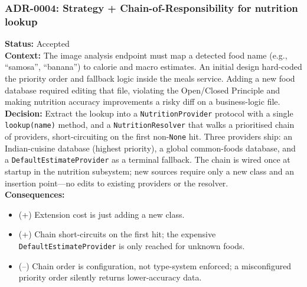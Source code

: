 \documentclass[11pt]{article}
\begin{document}
\subsubsection{ADR-0004: Strategy + Chain-of-Responsibility for nutrition lookup}
\textbf{Status:} Accepted \\
\textbf{Context:} The image analysis endpoint must map a detected food name (e.g., ``samosa'',
``banana'') to calorie and macro estimates. An initial design hard-coded the priority order and
fallback logic inside the meals service. Adding a new food database required editing that file,
violating the Open/Closed Principle and making nutrition accuracy improvements a risky diff
on a business-logic file. \\
\textbf{Decision:} Extract the lookup into a \texttt{NutritionProvider} protocol with a single
\texttt{lookup(name)} method, and a \texttt{NutritionResolver} that walks a prioritised chain
of providers, short-circuiting on the first non-\texttt{None} hit. Three providers ship:
an Indian-cuisine database (highest priority), a global common-foods database, and a
\texttt{DefaultEstimateProvider} as a terminal fallback. The chain is wired once at startup
in the nutrition subsystem; new sources require only a new class and an insertion point---no
edits to existing providers or the resolver. \\
\textbf{Consequences:}
\begin{itemize}[leftmargin=1.2em]
  \item (+) Extension cost is just adding a new class.
  \item (+) Chain short-circuits on the first hit; the expensive \texttt{DefaultEstimateProvider} is only reached for unknown foods.
  \item (--) Chain order is configuration, not type-system enforced; a misconfigured priority order silently returns lower-accuracy data.
\end{itemize}

\newpage
\end{document}

